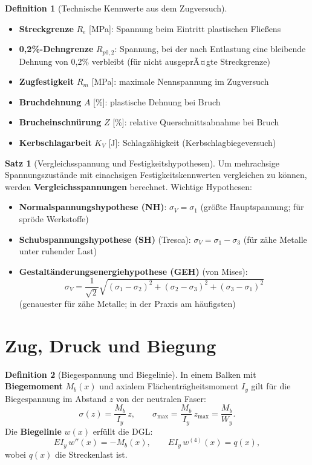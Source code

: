 ﻿\documentclass[a4paper,12pt]{report}
\theoremstyle{definition}
\newtheorem{definition}{Definition}
\newtheorem{satz}{Satz}
\begin{document}
\begin{definition}[Technische Kennwerte aus dem Zugversuch]
\begin{itemize}
    \item[-] \textbf{Streckgrenze} $R_e$ [MPa]: Spannung beim Eintritt plastischen Flie\ss{}ens
    \item[-] \textbf{0{,}2\%-Dehngrenze} $R_{p0,2}$: Spannung, bei der nach Entlastung
          eine bleibende Dehnung von 0{,}2\% verbleibt (f\"ur nicht ausgeprÃ¤gte Streckgrenze)
    \item[-] \textbf{Zugfestigkeit} $R_m$ [MPa]: maximale Nennspannung im Zugversuch
    \item[-] \textbf{Bruchdehnung} $A$ [\%]: plastische Dehnung bei Bruch
    \item[-] \textbf{Brucheinschn\"urung} $Z$ [\%]: relative Querschnittsabnahme bei Bruch
    \item[-] \textbf{Kerbschlagarbeit} $K_V$ [J]: Schlagz\"ahigkeit (Kerbschlagbiegeversuch)
\end{itemize}
\end{definition}

\begin{satz}[Vergleichsspannung und Festigkeitshypothesen]
Um mehrachsige Spannungszust\"ande mit einachsigen Festigkeitskennwerten
vergleichen zu k\"onnen, werden \textbf{Vergleichsspannungen} berechnet.
Wichtige Hypothesen:
\begin{itemize}
    \item[-] \textbf{Normalspannungshypothese (NH)}: $\sigma_V = \sigma_1$
          (gr\"o\ss{}te Hauptspannung; f\"ur spr\"ode Werkstoffe)
    \item[-] \textbf{Schubspannungshypothese (SH)} (Tresca):
          $\sigma_V = \sigma_1 - \sigma_3$ (f\"ur z\"ahe Metalle unter ruhender Last)
    \item[-] \textbf{Gestalt\"anderungsenergiehypothese (GEH)} (von Mises):
          \[
            \sigma_V = \frac{1}{\sqrt{2}}\sqrt{(\sigma_1-\sigma_2)^2+(\sigma_2-\sigma_3)^2+(\sigma_3-\sigma_1)^2}
          \]
          (genauester f\"ur z\"ahe Metalle; in der Praxis am h\"aufigsten)
\end{itemize}
\end{satz}

\section{Zug, Druck und Biegung}

\begin{definition}[Biegespannung und Biegelinie]
In einem Balken mit \textbf{Biegemoment} $M_b(x)$ und axialem
Fl\"achentr\"agheitsmoment $I_y$ gilt f\"ur die Biegespannung im Abstand $z$
von der neutralen Faser:
\[
  \sigma(z) = \frac{M_b}{I_y}\,z, \qquad
  \sigma_{\max} = \frac{M_b}{I_y}\,z_{\max} = \frac{M_b}{W_y}.
\]
Die \textbf{Biegelinie} $w(x)$ erf\"ullt die DGL:
\[
  EI_y\,w''(x) = -M_b(x), \qquad EI_y\,w^{(4)}(x) = q(x),
\]
wobei $q(x)$ die Streckenlast ist.
\end{definition}
\end{document}
